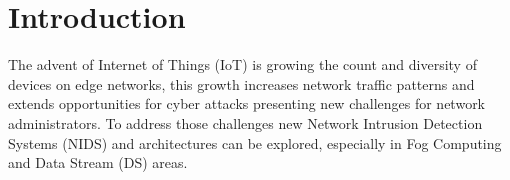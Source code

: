 \documentclass[conference]{IEEEtran}
\begin{document}
\section{Introduction}


\newcommand{\refminas}{\textit{Ref}\xspace}
\newcommand{\mfog}{\textit{MFOG}\xspace}
\newcommand{\iot}{IoT\xspace}
\newcommand{\nids}{NIDS\xspace}
\newcommand{\ds}{DS\xspace}

The advent of Internet of Things (\iot) is growing the count and diversity of
devices on edge networks, this growth increases network traffic patterns and
extends opportunities for cyber attacks presenting new challenges for network
administrators.
To address those challenges new Network Intrusion Detection Systems (NIDS) and
architectures can be explored, especially in Fog Computing and Data Stream (DS)
areas.
\end{document}
